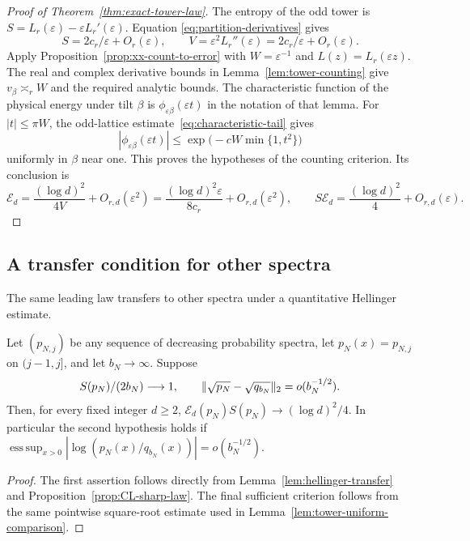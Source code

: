 \begin{proof}[Proof of Theorem~\ref{thm:exact-tower-law}]
The entropy of the odd tower is
$S=L_r(\varepsilon)-\varepsilon L_r'(\varepsilon)$. Equation
\eqref{eq:partition-derivatives} gives
\[
 S=2c_r/\varepsilon+O_r(\varepsilon),\qquad
 V=\varepsilon^2 L_r''(\varepsilon)
   =2c_r/\varepsilon+O_r(\varepsilon).
\]
Apply Proposition~\ref{prop:xx-count-to-error} with $W=\varepsilon^{-1}$
and $L(z)=L_r(\varepsilon z)$. The real and complex derivative bounds
in Lemma~\ref{lem:tower-counting} give $v_\beta\asymp_r W$ and the
required analytic bounds. The characteristic function of the physical
energy under tilt $\beta$ is $\phi_{\varepsilon\beta}(\varepsilon t)$
in the notation of that lemma. For $|t|\le\pi W$, the odd-lattice
estimate~\eqref{eq:characteristic-tail} gives
\[
 |\phi_{\varepsilon\beta}(\varepsilon t)|
 \le \exp\bigl(-c W\min\{1,t^2\}\bigr)
\]
uniformly in $\beta$ near one. This proves the hypotheses of the
counting criterion. Its conclusion is
\[
 \mathcal E_d=\frac{(\log d)^2}{4V}+O_{r,d}(\varepsilon^2)
      =\frac{(\log d)^2\varepsilon}{8c_r}+O_{r,d}(\varepsilon^2),
 \qquad
 S\mathcal E_d=\frac{(\log d)^2}{4}+O_{r,d}(\varepsilon).
\]
\end{proof}


\subsection{A transfer condition for other spectra}

The same leading law transfers to other spectra under a quantitative Hellinger estimate.

\begin{corollary}
\label{cor:CL-physical-transfer}
Let $(p_{N,j})$ be any sequence of decreasing probability spectra, let
$p_N(x)=p_{N,j}$ on $(j-1,j]$, and let $b_N\to\infty$.  Suppose
\begin{equation}\label{eq:physical-transfer-hypotheses}
 S(p_N)/(2b_N)\longrightarrow1,
 \qquad
 \lVert \sqrt{p_N}-\sqrt{q_{b_N}}\rVert_2=o(b_N^{-1/2}).
\end{equation}
Then, for every fixed integer $d\geq2$,
$\mathcal E_d(p_N)S(p_N)\to(\log d)^2/4$.
In particular the second hypothesis holds if
$\operatorname{ess\,sup}_{x>0}|\log(p_N(x)/q_{b_N}(x))|
=o(b_N^{-1/2})$.
\end{corollary}

\begin{proof}
The first assertion follows directly from
Lemma~\ref{lem:hellinger-transfer} and
Proposition~\ref{prop:CL-sharp-law}.  The final sufficient criterion
follows from the same pointwise square-root estimate used in
Lemma~\ref{lem:tower-uniform-comparison}.
\end{proof}

